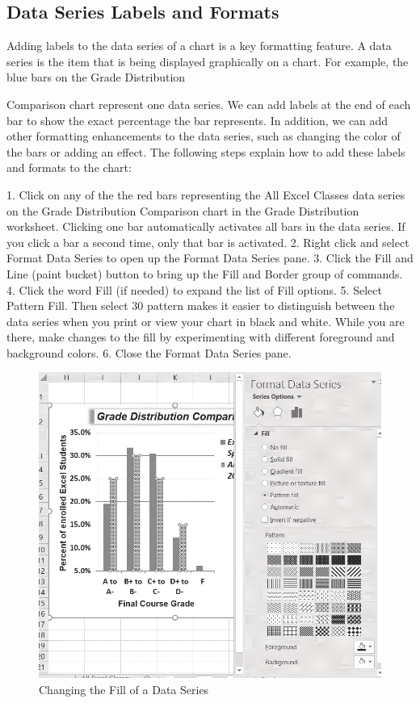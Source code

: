 \subsection{Data Series Labels and Formats}

Adding labels to the data series of a chart is a key formatting feature. A data series is the item
that is being displayed graphically on a chart. For example, the blue bars on the Grade Distribution

Comparison chart represent one data series. We can add labels at the end of each bar to show the
exact percentage the bar represents. In addition, we can add other formatting enhancements to the
data series, such as changing the color of the bars or adding an effect. The following steps explain how
to add these labels and formats to the chart:

1. Click on any of the the red bars representing the All Excel Classes data series on the Grade
Distribution Comparison chart in the Grade Distribution worksheet. Clicking one bar
automatically activates all bars in the data series. If you click a bar a second time, only that bar is
activated.
2. Right click and select Format Data Series to open up the Format Data Series pane.
3. Click the Fill and Line (paint bucket) button to bring up the Fill and Border group of
commands.
4. Click the word Fill (if needed) to expand the list of Fill options.
5. Select Pattern Fill. Then select 30%
pattern makes it easier to distinguish between the data series when you print or view your chart
in black and white. While you are there, make changes to the fill by experimenting with different
foreground and background colors.
6. Close the Format Data Series pane.



\begin{figure}[H]
	\centering
	\includegraphics[width=\maxwidth{.95\linewidth}]{gfx/ch04_fig36}
	\caption{Changing the Fill of a Data Series}
	\label{04:fig36}
\end{figure}

